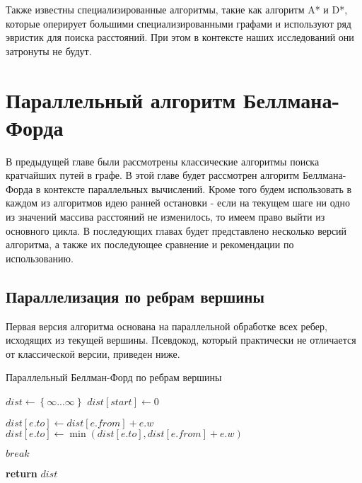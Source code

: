 Также известны специализированные алгоритмы, такие как алгоритм A* и D*, которые оперирует большими специализированными графами и используют ряд эвристик для поиска расстояний. При этом в контексте наших исследований они затронуты не будут.

\FloatBarrier
\section{Параллельный алгоритм Беллмана-Форда}

В предыдущей главе были рассмотрены классические алгоритмы поиска кратчайших путей в графе. В этой главе будет рассмотрен алгоритм Беллмана-Форда в контексте параллельных вычислений. Кроме того будем использовать в каждом из алгоритмов идею ранней остановки - если на текущем шаге ни одно из значений массива расстояний не изменилось, то имеем право выйти из основного цикла. В последующих главах будет представлено несколько версий алгоритма, а также их последующее сравнение и рекомендации по использованию.  

\FloatBarrier
\subsection{Параллелизация по ребрам вершины}
Первая версия алгоритма основана на параллельной обработке всех ребер, исходящих из текущей вершины. Псевдокод, который практически не отличается от классической версии, приведен ниже. 


\FloatBarrier
\begin{algorithm}
\caption{Параллельный Беллман-Форд по ребрам вершины}\label{bf_classic_par1}
\begin{algorithmic}[1]
\State $dist\gets \left\{ {\infty ... \infty}\right\}$
\State $dist[start] \gets 0$
 
		\algrenewcommand{}
				\State $dist[e.to] \gets dist[e.from] + e.w$
			\EndIf
			\State $dist[e.to] \gets \min(dist[e.to], dist[e.from] + e.w)$
		\EndFor	
		\algrenewcommand{}

	\EndFor
		\State $break$
	\EndIf

\EndFor
\State \textbf{return} $dist$
\EndProcedure
\end{algorithmic}
\end{algorithm}

